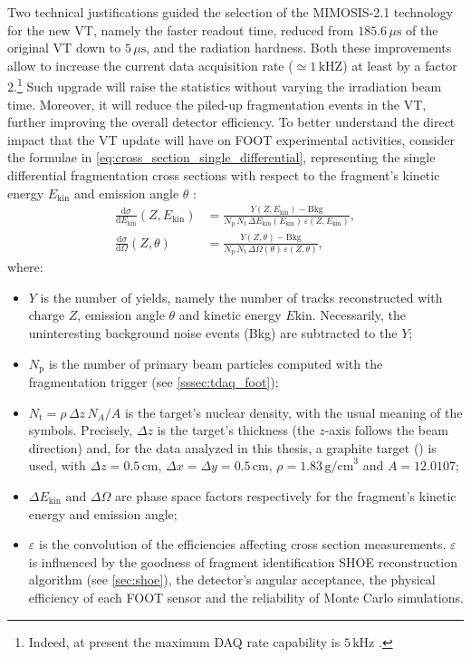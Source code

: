 Two technical justifications guided the selection of the MIMOSIS-2.1 technology for the new VT, namely the faster readout time, reduced from $185.6\,\mu\mathrm{s}$ of the original VT down to $5\,\mu\mathrm{s}$, and the radiation hardness. Both these improvements allow to increase the current data acquisition rate ($\simeq1\,\mathrm{kHZ}$) at least by a factor $2$.\footnote{Indeed, at present the maximum DAQ rate capability is $5\,\mathrm{kHz}$ \cite{9442772}.} Such upgrade will raise the statistics without varying the irradiation beam time. Moreover, it will reduce the piled-up fragmentation events in the VT, further improving the overall detector efficiency. To better understand the direct impact that the VT update will have on FOOT experimental activities, consider the formulae in \autoref{eq:cross_section_single_differential}, representing the single differential fragmentation cross sections with respect to the fragment's kinetic energy $E_\text{kin}$ \cite{slide_spighi} and emission angle $\theta$ \cite{footcollaboration2025angulardifferentialelementalfragmentation}:
\begin{equation}
	\begin{aligned}
		\frac{\text{d}\sigma}{\text{d}E_\text{kin}}(Z,E_\text{kin})
		&=
		\frac{Y(Z,E_\text{kin})-\text{Bkg}}
		{N_\text{p}\,N_\text{t}\,\Delta E_\text{kin}(E_\text{kin})\,
			\varepsilon(Z,E_\text{kin})},
		\\[1em]
		\frac{\text{d}\sigma}{\text{d}\Omega}(Z,\theta)
		&=
		\frac{Y(Z,\theta)-\text{Bkg}}
		{N_\text{p}\,N_\text{t}\,\Delta\Omega(\theta)\,
			\varepsilon(Z,\theta)},
	\end{aligned}
	\label{eq:cross_section_single_differential}
\end{equation}
where:
\begin{itemize}
	\item $Y$ is the number of yields, namely the number of tracks reconstructed with charge $Z$, emission angle $\theta$ and kinetic energy $E\text{kin}$. Necessarily, the uninteresting background noise events (Bkg) are subtracted to the $Y$;
	\item $N_\text{p}$ is the number of primary beam particles computed with the fragmentation trigger (see \autoref{sssec:tdaq_foot});
	\item $N_\text{t}=\rho\,\Delta z\,N_A/A$ is the target's nuclear density, with the usual meaning of the symbols. Precisely, $\Delta z$ is the target's thickness (the $z$-axis follows the beam direction) and, for the data analyzed in this thesis, a graphite target () is used, with $\Delta z=0.5\,\mathrm{cm}$, $\Delta x=\Delta y=0.5\,\mathrm{cm}$, $\rho=1.83\,\mathrm{g/cm}^3$ and $A=12.0107$;
	\item $\Delta E_\text{kin}$ and $\Delta\Omega$ are phase space factors respectively for the fragment's kinetic energy and emission angle;
	\item $\varepsilon$ is the convolution of the efficiencies affecting cross section measurements. $\varepsilon$ is influenced by the goodness of fragment identification SHOE reconstruction algorithm (see \autoref{sec:shoe}), the detector's angular acceptance, the physical efficiency of each FOOT sensor and the reliability of Monte Carlo simulations.
\end{itemize}
